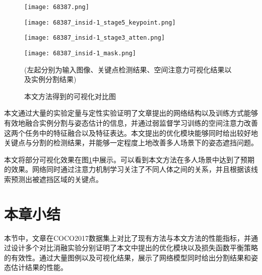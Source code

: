 \begin{figure}[htbp]
\begin{minipage}[t]{\linewidth}
		\vskip5pt
		\begin{minipage}[t]{0.23\linewidth}
			\texttt{[image: 68387.png]}
		\end{minipage}
		\begin{minipage}[t]{0.23\linewidth}
			\texttt{[image: 68387\_insid-1\_stage5\_keypoint.png]}
		\end{minipage}
		\begin{minipage}[t]{0.23\linewidth}
			\texttt{[image: 68387\_insid-1\_stage3\_atten.png]}
		\end{minipage}
		\begin{minipage}[t]{0.23\linewidth}
			\texttt{[image: 68387\_insid-1\_mask.png]}
		\end{minipage}
	\end{minipage}
	\caption{本文方法得到的可视化对比图}
	\begin{minipage}{\linewidth}
	\centering
	\wuhao
	(左起分别为输入图像、关键点检测结果、空间注意力可视化结果以及实例分割结果)
	\end{minipage}
	\label{fig:megavis}
\end{figure}

本文通过大量的实验定量与定性实验证明了文章提出的网络结构以及训练方式能够有效地融合实例分割与姿态估计的信息，并通过弱监督学习训练的空间注意力改善这两个任务中的特征融合以及特征表达。本文提出的优化模块能够同时给出较好地关键点与分割的检测结果，并能够一定程度上地改善多人场景下的姿态遮挡问题。

本文将部分可视化效果在图\ref{fig:megavis}中展示。可以看到本文方法在多人场景中达到了预期的效果。网络同时通过注意力机制学习关注了不同人体之间的关系，并且根据该线索预测出被遮挡区域的关键点。



\section{本章小结}
本节中，文章在COCO2017数据集上对比了现有方法与本文方法的性能指标，并通过设计多个对比消融实验分别证明了本文中提出的优化模块以及损失函数平衡策略的有效性。通过大量图例以及可视化结果，展示了网络模型同时给出分割结果和姿态估计结果的性能。